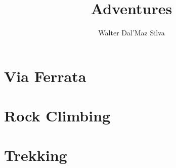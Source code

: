 \documentclass[10pt,twocolumn,oneside]{book}
\title{Adventures}
\author{Walter Dal'Maz Silva}
\date{}
\begin{document}
\frontmatter%

\tableofcontents%

\mainmatter%




\part{Via Ferrata}






\part{Rock Climbing}




\part{Trekking}


\end{document}
